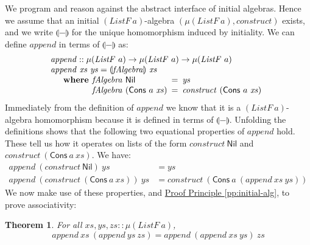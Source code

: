 \documentclass{jfp1}
\newcommand{\fold}[1]{\llparenthesis #1 \rrparenthesis}
\newtheorem{theorem}{Theorem}
\newcommand{\proofprinref}[1]{\hyperref[#1]{Proof Principle \ref*{#1}}}
\newcommand{\kw}[1]{\textbf{#1}}
\begin{document}
We program and reason against the abstract interface of initial
algebras. Hence we assume that an initial $(\mathit{ListF}~a)$-algebra
$(\mu(\mathit{ListF}~a), \mathit{construct})$ exists, and we write
$\fold{-}$ for the unique homomorphism induced by initiality. We can
define $\mathit{append}$ in terms of $\fold{-}$ as:
\begin{displaymath}
  \begin{array}{l}
    \mathit{append} :: \mu(\mathit{ListF}~a) \to \mu(\mathit{ListF}~a) \to \mu(\mathit{ListF}~a) \\
    \mathit{append}~\mathit{xs}~\mathit{ys} = \fold{\mathit{fAlgebra}}~\mathit{xs} \\
    \quad\begin{array}{r@{\hspace{0.4em}}l@{\hspace{0.5em}}c@{\hspace{0.5em}}l}
      \kw{where} & \mathit{fAlgebra}~\mathsf{Nil} &=& \mathit{ys} \\
                     & \mathit{fAlgebra}~(\mathsf{Cons}~a~\mathit{xs}) &=& \mathit{construct}~(\mathsf{Cons}~a~\mathit{xs})
    \end{array}
  \end{array}
\end{displaymath}
Immediately from the definition of $\mathit{append}$ we know that it
is a $(\mathit{ListF}~a)$-algebra homomorphism because it is defined
in terms of $\fold{-}$. Unfolding the definitions shows that the
following two equational properties of $\mathit{append}$ hold. These
tell us how it operates on lists of the form
$\mathit{construct}~\mathsf{Nil}$ and
$\mathit{construct}~(\mathsf{Cons}~a~\mathit{xs})$. We have:
\begin{align}
  \label{eq:append-nil}
  \mathit{append}~(\mathit{construct}~\mathsf{Nil})~\mathit{ys} & = \mathit{ys} \\
  \label{eq:append-cons}
  \mathit{append}~(\mathit{construct}~(\mathsf{Cons}~a~\mathit{xs}))~\mathit{ys} & = \mathit{construct}~(\mathsf{Cons}~a~(\mathit{append}~\mathit{xs}~\mathit{ys}))
\end{align}
We now make use of these properties, and
\proofprinref{pp:initial-alg}, to prove associativity:

\begin{theorem}\label{thm:append-assoc}
  For all $\mathit{xs}, \mathit{ys}, \mathit{zs} :: \mu(\mathit{ListF}~a)$,
  \begin{displaymath}
    \mathit{append}~\mathit{xs}~(\mathit{append}~\mathit{ys}~\mathit{zs}) = \mathit{append}~(\mathit{append}~\mathit{xs}~\mathit{ys})~\mathit{zs}
  \end{displaymath}
\end{theorem}
\end{document}

